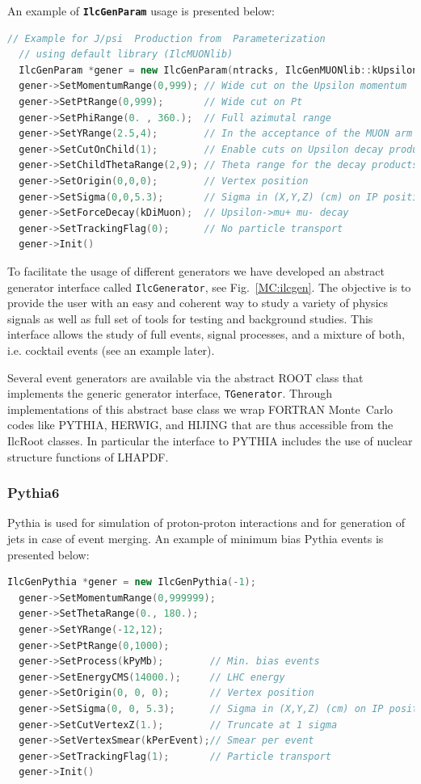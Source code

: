 \documentclass[12pt,a4paper,twoside]{article}
\makeatletter
\newcommand{\class}[1]{\texttt{\textbf{#1}}\xspace}
\newcommand {\MC} {Monte~Carlo\@\xspace}
\makeatother
\begin{document}
An example of \class{IlcGenParam} usage is presented below:

\begin{lstlisting}[language=C++]
  // Example for J/psi  Production from  Parameterization 
  // using default library (IlcMUONlib)                                       
  IlcGenParam *gener = new IlcGenParam(ntracks, IlcGenMUONlib::kUpsilon);
  gener->SetMomentumRange(0,999); // Wide cut on the Upsilon momentum
  gener->SetPtRange(0,999);       // Wide cut on Pt
  gener->SetPhiRange(0. , 360.);  // Full azimutal range
  gener->SetYRange(2.5,4);        // In the acceptance of the MUON arm
  gener->SetCutOnChild(1);        // Enable cuts on Upsilon decay products
  gener->SetChildThetaRange(2,9); // Theta range for the decay products
  gener->SetOrigin(0,0,0);        // Vertex position
  gener->SetSigma(0,0,5.3);       // Sigma in (X,Y,Z) (cm) on IP position
  gener->SetForceDecay(kDiMuon);  // Upsilon->mu+ mu- decay
  gener->SetTrackingFlag(0);      // No particle transport
  gener->Init()
\end{lstlisting}

To facilitate the usage of different generators we have developed
an abstract generator interface called \texttt{IlcGenerator}, see
Fig.~\ref{MC:ilcgen}.  The objective is to provide the user with
an easy and coherent way to study a variety of physics signals as
well as full set of tools for testing and background studies. This
interface allows the study of full events, signal processes, and
a mixture of both, i.e. cocktail events (see an example later).

Several event generators are available via the abstract ROOT class
that implements the generic generator interface, \texttt{TGenerator}.
Through implementations of this abstract base class we wrap
FORTRAN \MC codes like PYTHIA, HERWIG, and HIJING that are
thus accessible from the IlcRoot classes. In particular the
interface to PYTHIA includes the use of nuclear structure
functions of LHAPDF.


\subsubsection{Pythia6}

Pythia is used for simulation of proton-proton interactions and for
generation of jets in case of event merging. An example of minimum
bias Pythia events is presented below:

\begin{lstlisting}[language=C++]
  IlcGenPythia *gener = new IlcGenPythia(-1); 
  gener->SetMomentumRange(0,999999);
  gener->SetThetaRange(0., 180.);
  gener->SetYRange(-12,12);
  gener->SetPtRange(0,1000);
  gener->SetProcess(kPyMb);        // Min. bias events
  gener->SetEnergyCMS(14000.);     // LHC energy
  gener->SetOrigin(0, 0, 0);       // Vertex position
  gener->SetSigma(0, 0, 5.3);      // Sigma in (X,Y,Z) (cm) on IP position
  gener->SetCutVertexZ(1.);        // Truncate at 1 sigma
  gener->SetVertexSmear(kPerEvent);// Smear per event
  gener->SetTrackingFlag(1);       // Particle transport
  gener->Init()
\end{lstlisting}
\end{document}
